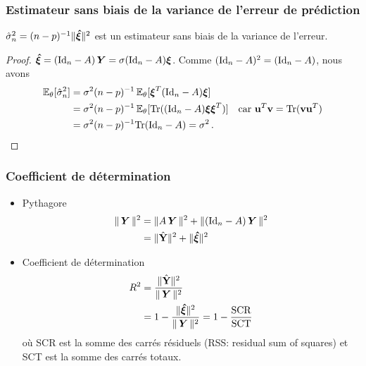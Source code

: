 \begin{frame}
\frametitle{Estimateur sans biais de la variance de l'erreur de prédiction}
\begin{theo}
$\hat{\sigma}_n^2= (n-p)^{-1} \| \boldsymbol{\hat{\xi}} \|^2$ est un estimateur sans biais de la variance de l'erreur.
\end{theo}
\begin{proof}
\alert{$\boldsymbol{\hat{\xi}}= (\mathrm{Id}_{n} - A) \operatorname{\boldsymbol{Y}}= \sigma (\mathrm{Id}_{n} - A) \boldsymbol{\xi}$}. Comme $(\mathrm{Id}_{n}-A)^2= (\mathrm{Id}_{n}-A)$, nous avons
\begin{align*}
\operatorname{{\mathbb E}}_{\theta}[\hat{\sigma}_n^2] &= \sigma^2 (n-p)^{-1} \operatorname{{\mathbb E}}_{\theta}[ \boldsymbol{\xi}^T (\mathrm{Id}_{n}-A) \boldsymbol{\xi}] \\
                             &= \sigma^2 (n-p)^{-1} \operatorname{{\mathbb E}}_{\theta}[ \mathrm{Tr}( (\mathrm{Id}_{n}-A) \boldsymbol{\xi} \boldsymbol{\xi}^T) ]  \quad \text{car $\mathbf{u}^T \mathbf{v}= \mathrm{Tr}(\mathbf{v} \mathbf{u}^T)$}\\
                             &= \sigma^2 (n-p)^{-1} \mathrm{Tr}(\mathrm{Id}_{n}-A)= \sigma^2 \,.
\end{align*}
\end{proof}
\end{frame}

\begin{frame}
\frametitle{Coefficient de détermination}
\begin{itemize}
\item \alert{Pythagore}
\begin{align*}
\| \operatorname{\boldsymbol{Y}} \|^2 &= \| A \operatorname{\boldsymbol{Y}} \|^2 + \| (\mathrm{Id}_{n} - A) \operatorname{\boldsymbol{Y}} \|^2 \\
            &= \| \hat{\mathbf{Y}} \|^2 + \| \boldsymbol{\hat{\xi}} \|^2
\end{align*}
\item \alert{Coefficient de détermination}
\begin{align*}
R^2 &= \frac{\|\hat{\mathbf{Y}}\|^2}{\|\operatorname{\boldsymbol{Y}}\|^2} \\
    &= 1 - \frac{\| \boldsymbol{\hat{\xi}} \|^2}{\|\operatorname{\boldsymbol{Y}}\|^2} = 1 - \frac{\mathrm{SCR}}{\mathrm{SCT}}
\end{align*}
où \alert{SCR} est la somme des carrés résiduels (RSS: residual sum of squares) et \alert{SCT} est la somme des carrés totaux.
\end{itemize}
\end{frame}

